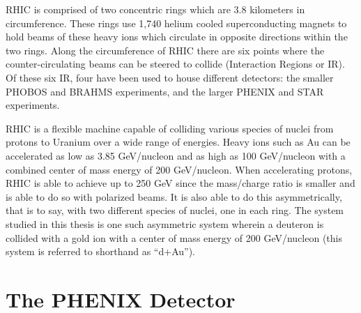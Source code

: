 RHIC is comprised of two concentric rings which are 3.8 kilometers in circumference.  These rings use 1,740 helium cooled superconducting magnets to hold beams of these heavy ions which circulate in opposite directions within the two rings.  Along the circumference of RHIC there are six points where the counter-circulating beams can be steered to collide (Interaction Regions or IR). Of these six IR, four have been used to house different detectors: the smaller PHOBOS and BRAHMS experiments, and the larger PHENIX and STAR experiments.  

RHIC is a flexible machine capable of colliding various species of nuclei from protons to Uranium \citep{EBISupgrade} over a wide range of energies.  Heavy ions such as Au can be accelerated as low as 3.85 GeV/nucleon and as high as 100 GeV/nucleon \citep{RHIClum} with a combined center of mass energy of 200 GeV/nucleon.  When accelerating protons, RHIC is able to achieve up to 250 GeV since the mass/charge ratio is smaller and is able to do so with polarized beams. It is also able to do this asymmetrically, that is to say, with two different species of nuclei, one in each ring.  The system studied in this thesis is one such asymmetric system wherein a deuteron is collided with a gold ion with a center of mass energy of 200 GeV/nucleon (this system is referred to shorthand as ``d+Au'').

\section{The PHENIX Detector}

